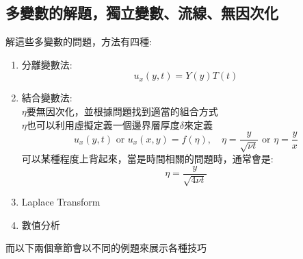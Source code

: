 \documentclass[../main.tex]{subfiles}
\begin{document}
\subsection{多變數的解題，獨立變數、流線、無因次化}
解這些多變數的問題，方法有四種:
\begin{enumerate}
  \item 分離變數法:
  \begin{equation}
    u_x(y,t) = Y(y)T(t)
  \end{equation}
  \item 結合變數法:\\
  $\eta$要無因次化，並根據問題找到適當的組合方式\\
  $\eta$也可以利用虛擬定義一個邊界層厚度$\delta$來定義
  \begin{equation}
    u_x(y,t) \text{ or } u_x(x,y) = f(\eta), \quad \eta = \frac{y}{\sqrt{\nu t}} \text{ or } \eta = \frac{y}{x}
  \end{equation}
  可以某種程度上背起來，當是時間相關的問題時，通常會是:
  \begin{equation}
    \eta = \frac{y}{\sqrt{4\nu t}}
  \end{equation}
  \item Laplace Transform
  \item 數值分析
\end{enumerate}
而以下兩個章節會以不同的例題來展示各種技巧
\end{document}
